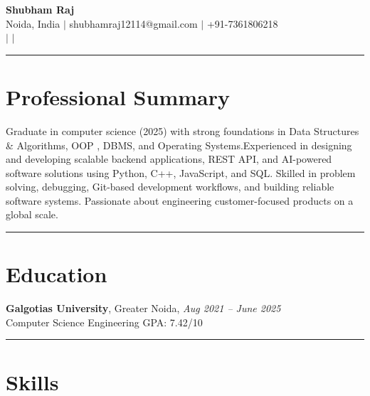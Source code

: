 \documentclass[a4paper,10pt]{article}
\newcommand{\sectionline}
{\vspace{-0.1em}\noindent\rule{\linewidth}{0.6pt}\vspace{-0.7em}}
\begin{document}

\begin{center}
{\LARGE \textbf{Shubham Raj}} \\[4pt]

Noida, India $\vert$
shubhamraj12114@gmail.com $\vert$
+91-7361806218 \\[4pt]

$\vert$
$\vert$

\end{center}

\vspace{-0.8em}


\sectionline
\section*{Professional Summary}

Graduate in computer science (2025) with strong foundations in Data Structures & Algorithms, OOP , DBMS, and Operating Systems.Experienced in designing and developing scalable backend applications, REST API, and AI-powered software solutions using Python, C++, JavaScript, and SQL. Skilled in problem solving, debugging, Git-based development workflows, and building reliable software systems. Passionate about engineering customer-focused products on a global scale.


\sectionline
\section*{Education}
\textbf{Galgotias University}, Greater Noida,  \hfill \textit{Aug 2021 -- June 2025}
\\
Computer Science Engineering  \hfill GPA: 7.42/10 \\
\sectionline
\section*{Skills}
\end{document}
